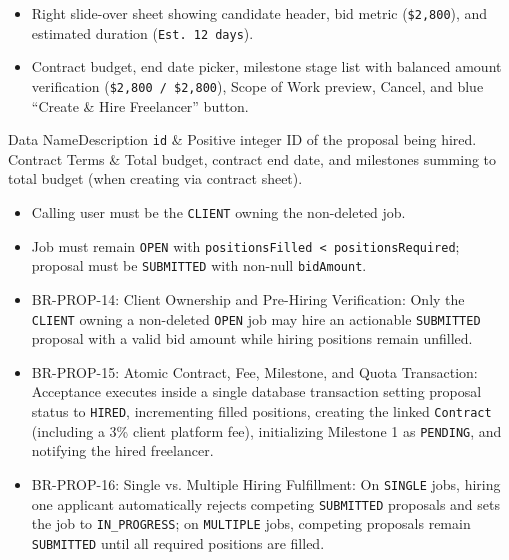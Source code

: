 \begin{itemize}[leftmargin=1.6em,topsep=3pt,itemsep=2pt,parsep=0pt,label=$\bullet$]
    \item Right slide-over sheet showing candidate header, bid metric (\texttt{\$2,800}), and estimated duration (\texttt{Est. 12 days}).
    \item Contract budget, end date picker, milestone stage list with balanced amount verification (\texttt{\$2,800 / \$2,800}), Scope of Work preview, Cancel, and blue ``Create \& Hire Freelancer'' button.
\end{itemize}


\begin{specdatatable}{Data Name}{Description}
\texttt{id} & Positive integer ID of the proposal being hired.\\ \hline
Contract Terms & Total budget, contract end date, and milestones summing to total budget (when creating via contract sheet).\\ \hline
\end{specdatatable}

\begin{itemize}[leftmargin=1.6em,topsep=3pt,itemsep=2pt,parsep=0pt,label=$\bullet$]
    \item Calling user must be the \texttt{CLIENT} owning the non-deleted job.
    \item Job must remain \texttt{OPEN} with \texttt{positionsFilled < positionsRequired}; proposal must be \texttt{SUBMITTED} with non-null \texttt{bidAmount}.
\end{itemize}

\begin{itemize}[leftmargin=1.6em,topsep=3pt,itemsep=2pt,parsep=0pt,label=$\bullet$]\brrulelist
    \item BR-PROP-14: Client Ownership and Pre-Hiring Verification: Only the \texttt{CLIENT} owning a non-deleted \texttt{OPEN} job may hire an actionable \texttt{SUBMITTED} proposal with a valid bid amount while hiring positions remain unfilled.
    \item BR-PROP-15: Atomic Contract, Fee, Milestone, and Quota Transaction: Acceptance executes inside a single database transaction setting proposal status to \texttt{HIRED}, incrementing filled positions, creating the linked \texttt{Contract} (including a 3\% client platform fee), initializing Milestone 1 as \texttt{PENDING}, and notifying the hired freelancer.
    \item BR-PROP-16: Single vs. Multiple Hiring Fulfillment: On \texttt{SINGLE} jobs, hiring one applicant automatically rejects competing \texttt{SUBMITTED} proposals and sets the job to \texttt{IN\_PROGRESS}; on \texttt{MULTIPLE} jobs, competing proposals remain \texttt{SUBMITTED} until all required positions are filled.
\end{itemize}

